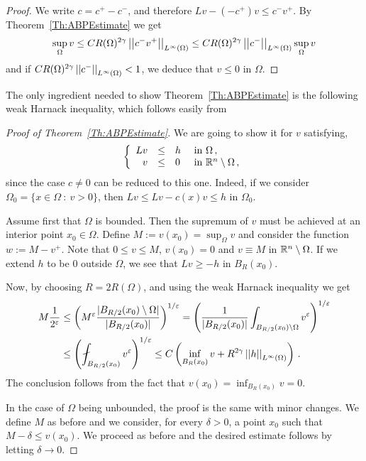 \begin{proof}
	We write $c= c^+ - c^-$, and therefore $Lv -(-c^+)v \leq c^- v^+	$. By Theorem~\ref{Th:ABPEstimate} we get
	$$
	\sup_\Omega v \leq C R(\Omega)^{2\gamma} \left | \left |{c^- v^+} \right | \right |_{L^\infty(\Omega)} \leq C R(\Omega)^{2\gamma} \left | \left |{c^-} \right | \right |_{L^\infty(\Omega)} \sup_\Omega v 
	$$
	and if $C R(\Omega)^{2\gamma} \left | \left |{c^-} \right | \right |_{L^\infty(\Omega)}  <1 $, we deduce that $v\leq 0$ in $\Omega$.
\end{proof}

The only ingredient needed to show Theorem~\ref{Th:ABPEstimate} is the following weak Harnack inequality, which follows easily from \cite{DiCastoKuusiPalatucci}


\begin{proof}[Proof of Theorem~\ref{Th:ABPEstimate}]
	We are going to show it for $v$ satisfying,
	$$
	\left\{\begin{array}{rcll}
	Lv &\leq & h & \text{ in } \Omega\,, \\
	v & \leq & 0 & \text{ in } \mathbb{R}^n\setminus \Omega\,,
	\end{array} \right.
	$$
	since the case $c\neq 0$ can be reduced to this one. Indeed, if we consider $\Omega_0 = \{x \in \Omega \ : \ v > 0\}$, then $Lv \leq Lv - c(x)v \leq h$ in $\Omega_0$.
	
	Assume first that $\Omega$ is bounded. Then the supremum of $v$ must be achieved at an interior point $x_0\in \Omega$. Define	$M:= v(x_0) = \sup_\Omega v$ and consider the function $w := M - v^+$. Note that $0 \leq v \leq M$, $v(x_0) = 0$ and $v \equiv M$ in $\mathbb{R}^n \setminus \Omega$. If we extend $h$ to be $0$ outside $\Omega$, we see that $Lv \geq -h$ in $B_R(x_0)$. 
	
	Now, by choosing $R= 2R(\Omega)$, and using the weak Harnack inequality  we get
	\begin{align*}
		M \dfrac{1}{2^\varepsilon} & \leq \bpar{M^{\varepsilon}\dfrac{|B_{R/2}(x_0)\setminus \Omega|}{|B_{R/2}(x_0)|}}^{1/\varepsilon}= \bpar{\dfrac{1}{|B_{R/2}(x_0)|} \int_{B_{R/2}(x_0)\setminus \Omega} v^\varepsilon}^{1/\varepsilon} \\ 
		& \leq \bpar{ \fint_{B_{R/2}(x_0)} v^\varepsilon}^{1/\varepsilon} \leq C \bpar{\inf_{B_{R}(x_0)} v + R^{2\s} \norm{h}_{L^{\infty}(\Omega)} }\,.
	\end{align*}
	The conclusion follows from the fact that $v(x_0)= \inf_{B_{R}(x_0)} v = 0$.
	
	In the case of $\Omega$ being unbounded, the proof is the same with minor changes. We define $M$ as before and we consider, for every $\delta > 0$, a point $x_0$ such that $M-\delta \leq v(x_0)$. We proceed as before and the desired estimate follows by letting $\delta \to 0$. 
\end{proof}
 

